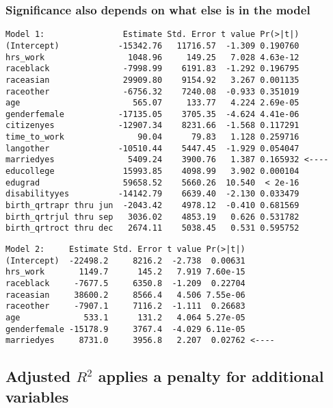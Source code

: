 \documentclass[slidestop,compress,mathserif,12pt,t,professionalfonts,xcolor=table]{beamer}
\begin{document}
\begin{frame}[fragile]
\frametitle{Significance also depends on what else is in the model}

{\tiny
\begin{Verbatim}[frame=single, formatcom=\color{gray}]
Model 1:                Estimate Std. Error t value Pr(>|t|)    
(Intercept)            -15342.76   11716.57  -1.309 0.190760    
hrs_work                 1048.96     149.25   7.028 4.63e-12 
raceblack               -7998.99    6191.83  -1.292 0.196795    
raceasian               29909.80    9154.92   3.267 0.001135 
raceother               -6756.32    7240.08  -0.933 0.351019   
age                       565.07     133.77   4.224 2.69e-05 
genderfemale           -17135.05    3705.35  -4.624 4.41e-06 
citizenyes             -12907.34    8231.66  -1.568 0.117291    
time_to_work               90.04      79.83   1.128 0.259716    
langother              -10510.44    5447.45  -1.929 0.054047  
marriedyes               5409.24    3900.76   1.387 0.165932 <----    
educollege              15993.85    4098.99   3.902 0.000104 
edugrad                 59658.52    5660.26  10.540  < 2e-16 
disabilityyes          -14142.79    6639.40  -2.130 0.033479   
birth_qrtrapr thru jun  -2043.42    4978.12  -0.410 0.681569    
birth_qrtrjul thru sep   3036.02    4853.19   0.626 0.531782    
birth_qrtroct thru dec   2674.11    5038.45   0.531 0.595752    
\end{Verbatim}
}
\pause
{\tiny
\begin{Verbatim}[frame=single, formatcom=\color{gray}]
Model 2:     Estimate Std. Error t value Pr(>|t|)    
(Intercept)  -22498.2     8216.2  -2.738  0.00631
hrs_work       1149.7      145.2   7.919 7.60e-15
raceblack     -7677.5     6350.8  -1.209  0.22704    
raceasian     38600.2     8566.4   4.506 7.55e-06
raceother     -7907.1     7116.2  -1.111  0.26683    
age             533.1      131.2   4.064 5.27e-05
genderfemale -15178.9     3767.4  -4.029 6.11e-05
marriedyes     8731.0     3956.8   2.207  0.02762 <----
\end{Verbatim}
}

\end{frame}


\subsection{Adjusted $R^2$ applies a penalty for additional variables}
\label{mi4}
\end{document}
